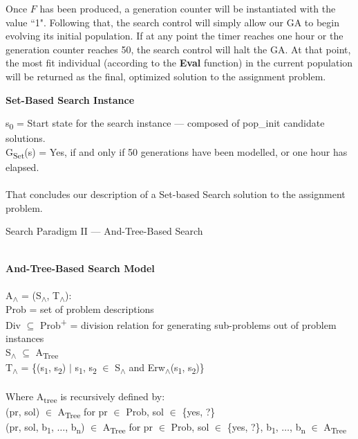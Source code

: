 \documentclass[11pt, oneside]{article}   	%
\begin{document}
\noindent Once $F$ has been produced, a generation counter will be instantiated with the value ``1". Following that, the search control will simply allow our GA to begin evolving its initial population. If at any point the timer reaches one hour or the generation counter reaches 50, the search control will halt the GA. At that point, the most fit individual (according to the \textbf{Eval} function) in the current population will be returned as the final, optimized solution to the assignment problem.

\noindent \textbf{Set-Based Search Instance}

\noindent s\textsubscript{0} = Start state for the search instance --- composed of pop_init candidate solutions.\\
G\textsubscript{Set}(s) = Yes, if and only if 50 generations have been modelled, or one hour has elapsed.\\\\

\noindent That concludes our description of a Set-based Search solution to the assignment problem.

\newpage

\centerline{{\Large Search Paradigm II --- And-Tree-Based Search}}
\noindent \textbf{\\And-Tree-Based Search Model}\\\\
A\textsubscript{$\land$} = (S\textsubscript{$\land$}, T\textsubscript{$\land$}):\\
\indent Prob = set of problem descriptions\\
\indent Div $\subseteq$ Prob\textsuperscript{+} = division relation for generating sub-problems out of problem instances\\
\indent S\textsubscript{$\land$} $\subseteq$ A\textsubscript{Tree}\\
\indent T\textsubscript{$\land$} = \{(s\textsubscript{1}, s\textsubscript{2}) $\vert$ s\textsubscript{1}, s\textsubscript{2} $\in$ S\textsubscript{$\land$} and Erw\textsubscript{$\land$}(s\textsubscript{1}, s\textsubscript{2})\}\\\\
Where A\textsubscript{tree} is recursively defined by:\\
\indent (pr, sol) $\in$ A\textsubscript{Tree} for pr $\in$ Prob, sol $\in$ \{yes, ?\}\\
\indent (pr, sol, b\textsubscript{1}, $\ldots$, b\textsubscript{n}) $\in$ A\textsubscript{Tree} for pr $\in$ Prob, sol $\in$ \{yes, ?\}, b\textsubscript{1}, $\ldots$, b\textsubscript{n} $\in$ A\textsubscript{Tree}
\end{document}
